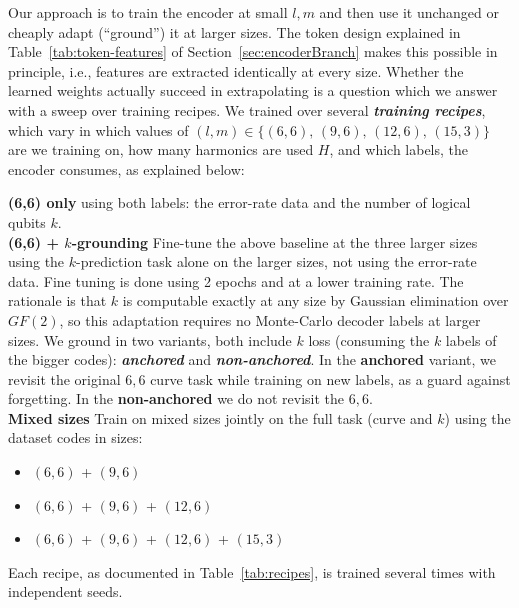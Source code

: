 \noindent Our approach is to train the encoder at small \(l,m\) and then use it unchanged
or cheaply adapt (``ground'') it at larger sizes. The token design explained in Table~\ref{tab:token-features} of
Section~\ref{sec:encoderBranch} makes this possible in principle, i.e., features are
extracted identically at every size. Whether the learned weights actually succeed in extrapolating is a
question which we answer with a sweep over training recipes.
We trained over several \textit{\textbf{training recipes}}, which vary in which values of \((l,m)\in\{(6,6),\,(9,6),\,(12,6),\,(15,3)\}\) are we training on, 
how many harmonics are used \(H\), and which labels, the encoder consumes, as explained below:

\noindent \textbf{(6,6) only} using both labels: the error-rate data and the number of logical qubits \(k\).\\
\noindent\textbf{(6,6) + \(k\)-grounding} Fine-tune the above baseline at the three larger sizes
using the \(k\)-prediction task alone on the larger sizes, not using the error-rate data. Fine tuning is done using 2 epochs and at a lower training rate. The rationale is that \(k\) is
computable exactly at any size by Gaussian elimination over \(GF(2)\), so
this adaptation requires no Monte-Carlo decoder labels at larger sizes. We ground in two
variants, both include \(k\) loss (consuming the \(k\) labels of the bigger codes): \textbf{\textit{anchored}} and \textbf{\textit{non-anchored}}.
In the \textbf{anchored} variant, we revisit the original \(6,6\) curve task while training on new labels, as a guard against forgetting. In the \textbf{non-anchored} we do not revisit the \(6,6\).\\
\noindent\textbf{Mixed sizes} Train on mixed sizes jointly on the full task (curve and \(k\)) using the dataset codes in sizes:
\begin{itemize}
\item \((6,6)\) + \((9,6)\)
\item \((6,6)\) + \((9,6)\) + \((12,6)\)
\item \((6,6)\) + \((9,6)\) + \((12,6)\) + \((15,3)\)
\end{itemize}
\noindent Each recipe, as documented in Table~\ref{tab:recipes}, is trained several times with independent seeds.

